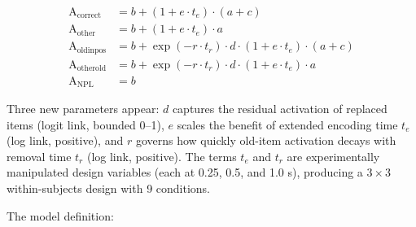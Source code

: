 \documentclass[
  man,
  floatsintext,
  longtable,
  nolmodern,
  notxfonts,
  notimes,
  colorlinks=true,linkcolor=blue,citecolor=blue,urlcolor=blue]{apa7}
\begin{document}
\[
\begin{aligned}
\text{A}_{\text{correct}}  &= b + (1 + e \cdot t_e) \cdot (a + c) \\
\text{A}_{\text{other}}    &= b + (1 + e \cdot t_e) \cdot a \\
\text{A}_{\text{oldinpos}} &= b + \exp(-r \cdot t_r) \cdot d \cdot (1 + e \cdot t_e) \cdot (a + c) \\
\text{A}_{\text{otherold}} &= b + \exp(-r \cdot t_r) \cdot d \cdot (1 + e \cdot t_e) \cdot a \\
\text{A}_{\text{NPL}}      &= b
\end{aligned}
\]

Three new parameters appear: \(d\) captures the residual activation of
replaced items (logit link, bounded 0--1), \(e\) scales the benefit of
extended encoding time \(t_e\) (log link, positive), and \(r\) governs
how quickly old-item activation decays with removal time \(t_r\) (log
link, positive). The terms \(t_e\) and \(t_r\) are experimentally
manipulated design variables (each at 0.25, 0.5, and 1.0 s), producing a
\(3 \times 3\) within-subjects design with 9 conditions.

The model definition:
\end{document}
